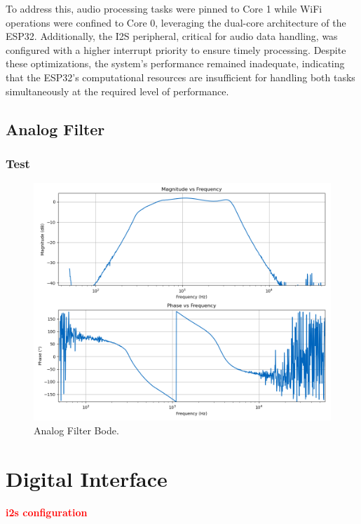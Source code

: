 To address this, audio processing tasks were pinned to Core 1 while WiFi operations were confined to Core 0, leveraging the dual-core architecture of the ESP32. Additionally, the I2S peripheral, critical for audio data handling, was configured with a higher interrupt priority to ensure timely processing. Despite these optimizations, the system's performance remained inadequate, indicating that the ESP32's computational resources are insufficient for handling both tasks simultaneously at the required level of performance.

\subsection{Analog Filter}

\subsubsection{Test}

\begin{figure}[H]
    \centering
    \includegraphics*[scale = 0.5]{Images/AnalogFilterScoppyBode.png}
    \caption{Analog Filter Bode.}
    \label{fig:AnalogFilterBodeScoppy}
\end{figure}

\section{Digital Interface}

\textcolor{red}{\textbf{i2s configuration}}
